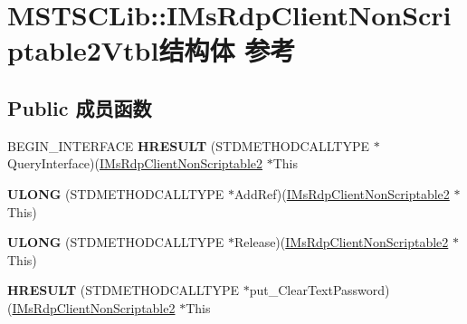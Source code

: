 \hypertarget{struct_m_s_t_s_c_lib_1_1_i_ms_rdp_client_non_scriptable2_vtbl}{}\section{M\+S\+T\+S\+C\+Lib\+:\+:I\+Ms\+Rdp\+Client\+Non\+Scriptable2\+Vtbl结构体 参考}
\label{struct_m_s_t_s_c_lib_1_1_i_ms_rdp_client_non_scriptable2_vtbl}
\subsection*{Public 成员函数}
\begin{DoxyCompactItemize}
\item 
\mbox{\label{struct_m_s_t_s_c_lib_1_1_i_ms_rdp_client_non_scriptable2_vtbl_a3c84b95e1f1fc20fdf4ee6ccdce674e6}} 
B\+E\+G\+I\+N\+\_\+\+I\+N\+T\+E\+R\+F\+A\+CE {\bfseries H\+R\+E\+S\+U\+LT} (S\+T\+D\+M\+E\+T\+H\+O\+D\+C\+A\+L\+L\+T\+Y\+PE $\ast$Query\+Interface)(\hyperlink{interface_m_s_t_s_c_lib_1_1_i_ms_rdp_client_non_scriptable2}{I\+Ms\+Rdp\+Client\+Non\+Scriptable2} $\ast$This
\item 
\mbox{\label{struct_m_s_t_s_c_lib_1_1_i_ms_rdp_client_non_scriptable2_vtbl_a32f56923fb551c5da585d60dbaa36885}} 
{\bfseries U\+L\+O\+NG} (S\+T\+D\+M\+E\+T\+H\+O\+D\+C\+A\+L\+L\+T\+Y\+PE $\ast$Add\+Ref)(\hyperlink{interface_m_s_t_s_c_lib_1_1_i_ms_rdp_client_non_scriptable2}{I\+Ms\+Rdp\+Client\+Non\+Scriptable2} $\ast$This)
\item 
\mbox{\label{struct_m_s_t_s_c_lib_1_1_i_ms_rdp_client_non_scriptable2_vtbl_a045ad8b5a0d6de9bd7adf371b9928d77}} 
{\bfseries U\+L\+O\+NG} (S\+T\+D\+M\+E\+T\+H\+O\+D\+C\+A\+L\+L\+T\+Y\+PE $\ast$Release)(\hyperlink{interface_m_s_t_s_c_lib_1_1_i_ms_rdp_client_non_scriptable2}{I\+Ms\+Rdp\+Client\+Non\+Scriptable2} $\ast$This)
\item 
\mbox{\label{struct_m_s_t_s_c_lib_1_1_i_ms_rdp_client_non_scriptable2_vtbl_a48e58b554da807347b8b24f15e51e9bf}} 
{\bfseries H\+R\+E\+S\+U\+LT} (S\+T\+D\+M\+E\+T\+H\+O\+D\+C\+A\+L\+L\+T\+Y\+PE $\ast$put\+\_\+\+Clear\+Text\+Password)(\hyperlink{interface_m_s_t_s_c_lib_1_1_i_ms_rdp_client_non_scriptable2}{I\+Ms\+Rdp\+Client\+Non\+Scriptable2} $\ast$This

\end{DoxyCompactItemize}
